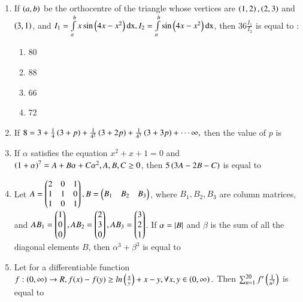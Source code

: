 \documentclass[journal]{IEEEtran}
\begin{document}
\begin{enumerate}[start=16]
\item If $\left(a,b\right)$ be the orthocentre of the triangle whose vertices are $\left(1,2\right), \left(2,3\right)$ and $\left(3,1\right)$, and $I_1=\int\limits_a^b x\sin\left(4x-x^2\right)\text{dx}, I_2=\int\limits_a^b \sin\left(4x-x^2\right)\text{dx}$, then $36\frac{I_1}{I_2}$ is equal to :
\begin{enumerate}
    \item 80
    \item 88
    \item 66
    \item 72
\end{enumerate}







\item If $8=3+\frac{1}{4}\left(3+p\right)+\frac{1}{4^2}\left(3+2p\right)+\frac{1}{4^3}\left(3+3p\right)+\cdots\infty,$ then the value of $p$ is \underline{\hspace{1cm}} \\

\item If $\alpha$ satisfies the equation $x^2+x+1=0$ and $\left(1+\alpha\right)^7=A+B\alpha+C\alpha^{2}, A, B,C \geq 0$, then $5\left(3A-2B-C\right)$ is equal to \underline{\hspace{1cm}}\\

\item Let $A=\begin{pmatrix}2&0&1\\1&1&0\\1&0&1\end{pmatrix}, B=\begin{pmatrix}B_1&B_2&B_3\end{pmatrix}$, where $B_1,B_2,B_3$ are column matrices, and $AB_1=\begin{pmatrix}1\\0\\0\end{pmatrix}, AB_2=\begin{pmatrix}2\\3\\0\end{pmatrix}, AB_3=\begin{pmatrix}3\\2\\1\end{pmatrix}$. If $\alpha=\left\vert B\right\vert$ and $\beta$ is the sum of all the diagonal elements $B$, then $\alpha ^3+\beta ^3$ is equal to  \underline{\hspace{1cm}}\\

\item Let for a differentiable function $f : \left(0, \infty\right)\rightarrow R, f(x)-f(y)\geq ln\left(\frac{x}{y}\right)+x-y,\forall x,y \in\left(0,\infty\right).$ Then $\sum_{n=1}^{20}f'\left(\frac{1}{n^2}\right)$ is equal to \underline{\hspace{1cm}}\\


\end{enumerate}
\end{document}
